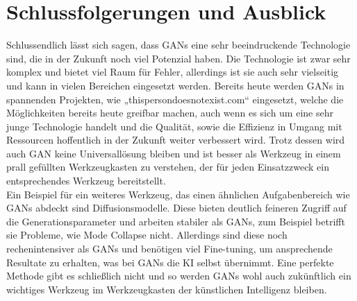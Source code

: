 \chapter{Schlussfolgerungen und Ausblick}

\noindent Schlussendlich lässt sich sagen, dass \acp{GAN} eine sehr beeindruckende Technologie sind, die in der Zukunft noch viel Potenzial haben. Die Technologie ist zwar sehr komplex und bietet viel Raum für Fehler, allerdings ist sie auch sehr vielseitig und kann in vielen Bereichen eingesetzt werden. Bereits heute werden \acp{GAN} in spannenden Projekten, wie „thispersondoesnotexist.com“ eingesetzt, welche die Möglichkeiten bereits heute greifbar machen, auch wenn es sich um eine sehr junge Technologie handelt und die Qualität, sowie die Effizienz in Umgang mit Ressourcen hoffentlich in der Zukunft weiter verbessert wird. Trotz dessen wird auch \ac{GAN} keine Universallösung bleiben und ist besser als Werkzeug in einem prall gefüllten Werkzeugkasten zu verstehen, der für jeden Einsatzzweck ein entsprechendes Werkzeug bereitstellt. \\

\noindent Ein Beispiel für ein weiteres Werkzeug, das einen ähnlichen Aufgabenbereich wie \acp{GAN} abdeckt sind Diffusionsmodelle. Diese bieten deutlich feineren Zugriff auf die Generationsparameter und arbeiten stabiler als \acp{GAN}, zum Beispiel betrifft sie Probleme, wie Mode Collapse nicht. Allerdings sind diese noch rechenintensiver als \acp{GAN} und benötigen viel Fine-tuning, um ansprechende Resultate zu erhalten, was bei \acp{GAN} die KI selbst übernimmt. Eine perfekte Methode gibt es schließlich nicht und so werden \acp{GAN} wohl auch zukünftlich ein wichtiges Werkzeug im Werkzeugkasten der künstlichen Intelligenz bleiben.\\

\noindent 

\newpage

